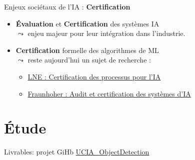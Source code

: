 \documentclass[11pt,serif,mathserif,compress,hyperref={colorlinks}]{beamer}
\begin{document}
\begin{frame}{Enjeux sociétaux de l'IA : {\bf Certification}}
  
  \begin{tcolorbox}[title={\bf Certification}]
    \begin{itemize}
    \item {\bf Évaluation} et {\bf Certification} des systèmes IA\\
      $\leadsto$ enjeu majeur pour leur intégration dans l'industrie. \medskip
    \item {\bf Certification} formelle des algorithmes de ML\\
      $\leadsto$ reste aujourd'hui un sujet de recherche :
      \begin{itemize}
      \item \href{https://www.lne.fr/fr/service/certification/certification-processus-ia}{LNE : Certification des processus pour l'IA}
      \item \href{https://www.hhi.fraunhofer.de/en/departments/ai/technologies-and-solutions/auditing-and-certification-of-ai-systems.html}
           {Fraunhoher : Audit et certification des systèmes d'IA}
      \end{itemize}
    \end{itemize}
  \end{tcolorbox}
    
\end{frame}

\section{Étude}

\begin{frame}{}

  \vfill
  \vfill
  Livrables: projet GiHb \href{https://github.com/cjlux/UCIA_ObjectDetection/tree/master}{UCIA\_ObjectDetection}
  \vfill

\end{frame}
\end{document}
